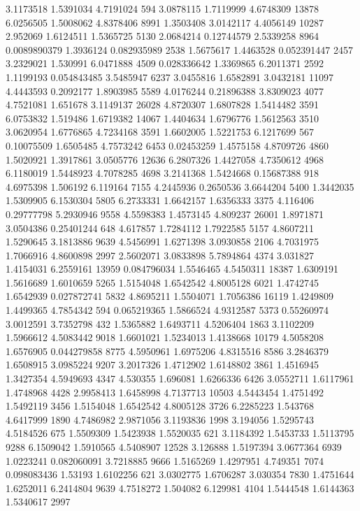 3.1173518 1.5391034 4.7191024 594
3.0878115 1.7119999 4.6748309 13878
6.0256505 1.5008062 4.8378406 8991
1.3503408 3.0142117 4.4056149 10287
2.952069 1.6124511 1.5365725 5130
2.0684214 0.12744579 2.5339258 8964
0.0089890379 1.3936124 0.082935989 2538
1.5675617 1.4463528 0.052391447 2457
3.2329021 1.530991 6.0471888 4509
0.028336642 1.3369865 6.2011371 2592
1.1199193 0.054843485 3.5485947 6237
3.0455816 1.6582891 3.0432181 11097
4.4443593 0.2092177 1.8903985 5589
4.0176244 0.21896388 3.8309023 4077
4.7521081 1.651678 3.1149137 26028
4.8720307 1.6807828 1.5414482 3591
6.0753832 1.519486 1.6719382 14067
1.4404634 1.6796776 1.5612563 3510
3.0620954 1.6776865 4.7234168 3591
1.6602005 1.5221753 6.1217699 567
0.10075509 1.6505485 4.7573242 6453
0.02453259 1.4575158 4.8709726 4860
1.5020921 1.3917861 3.0505776 12636
6.2807326 1.4427058 4.7350612 4968
6.1180019 1.5448923 4.7078285 4698
3.2141368 1.5424668 0.15687388 918
4.6975398 1.506192 6.119164 7155
4.2445936 0.2650536 3.6644204 5400
1.3442035 1.5309905 6.1530304 5805
6.2733331 1.6642157 1.6356333 3375
4.116406 0.29777798 5.2930946 9558
4.5598383 1.4573145 4.809237 26001
1.8971871 3.0504386 0.25401244 648
4.617857 1.7284112 1.7922585 5157
4.8607211 1.5290645 3.1813886 9639
4.5456991 1.6271398 3.0930858 2106
4.7031975 1.7066916 4.8600898 2997
2.5602071 3.0833898 5.7894864 4374
3.031827 1.4154031 6.2559161 13959
0.084796034 1.5546465 4.5450311 18387
1.6309191 1.5616689 1.6010659 5265
1.5154048 1.6542542 4.8005128 6021
1.4742745 1.6542939 0.027872741 5832
4.8695211 1.5504071 1.7056386 16119
1.4249809 1.4499365 4.7854342 594
0.065219365 1.5866524 4.9312587 5373
0.55260974 3.0012591 3.7352798 432
1.5365882 1.6493711 4.5206404 1863
3.1102209 1.5966612 4.5083442 9018
1.6601021 1.5234013 1.4138668 10179
4.5058208 1.6576905 0.044279858 8775
4.5950961 1.6975206 4.8315516 8586
3.2846379 1.6508915 3.0985224 9207
3.2017326 1.4712902 1.6148802 3861
1.4516945 1.3427354 4.5949693 4347
4.530355 1.696081 1.6266336 6426
3.0552711 1.6117961 1.4748968 4428
2.9958413 1.6458998 4.7137713 10503
4.5443454 1.4751492 1.5492119 3456
1.5154048 1.6542542 4.8005128 3726
6.2285223 1.543768 4.6417999 1890
4.7486982 2.9871056 3.1193836 1998
3.194056 1.5295743 4.5184526 675
1.5509309 1.5423938 1.5520035 621
3.1184392 1.5453733 1.5113795 9288
6.1509042 1.5910565 4.5408907 12528
3.126888 1.5197394 3.0677364 6939
1.0223241 0.082060091 3.7218885 9666
1.5165269 1.4297951 4.749351 7074
0.098083436 1.53193 1.6102256 621
3.0302775 1.6706287 3.030354 7830
1.4751644 1.6252011 6.2414804 9639
4.7518272 1.504082 6.129981 4104
1.5444548 1.6144363 1.5340617 2997
